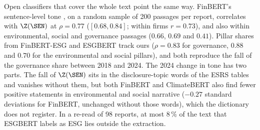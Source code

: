 
Open classifiers that cover the whole text point the same way. FinBERT's
sentence-level tone \citep{huang2023finbert}, on a random sample of 200 passages
per report, correlates with $\Z(\SEN)$ at $\rho = 0.77$ ($[0.68, 0.84]$; within
firms $r = 0.73$), and also within environmental, social and governance passages
($0.66$, $0.69$ and $0.41$). Pillar shares from FinBERT-ESG and ESGBERT
\citep{schimanski2024esgbert} track ours ($\rho = 0.83$ for governance, $0.88$
and $0.70$ for the environmental and social pillars), and both reproduce the fall
of the governance share between 2018 and 2024. The 2024 change in tone has two
parts. The fall of $\Z(\SEN)$ sits in the disclosure-topic words of the ESRS
tables and vanishes without them, but both FinBERT and ClimateBERT also find fewer
positive statements in environmental and social narrative ($-0.27$ standard
deviations for FinBERT, unchanged without those words), which the dictionary does
not register. In a re-read of 98 reports, at most 8\,\% of the text that ESGBERT
labels as ESG lies outside the extraction.

